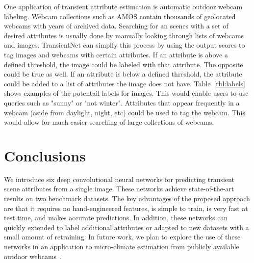\documentclass{article}
\newcommand{\tblref}[1]{Table~\ref{tbl:#1}}
\begin{document}
One application of transient attribute estimation is automatic outdoor
webcam labeling. Webcam collections such as AMOS\cite{jacobs07amos} contain
thousands of geolocated webcams with years of archived data.  Searching
for an scenes with a set of desired attributes is usually done by manually
looking through lists of webcams and images.  TransientNet can simplfy this
process by using the output scores to tag images and webcams with certain 
attributes.  If an attribute is above a defined threshold, the image could 
be labeled with that attribute.  The opposite could be true as well.  If an
attribute is below a defined threshold, the attribute could be added to a 
list of attributes the image does not have.  \tblref{labels} shows examples of
the potentail labels for images. This would enable users to use queries such 
as "sunny" or "not winter".  Attributes that appear frequently in a webcam 
(aside from daylight, night, etc) could be used to tag the webcam.  This would 
allow for much easier searching of large collections of webcams.


\section{Conclusions}

We introduce six deep convolutional neural networks for predicting
transient scene attributes from a single image. These networks achieve
state-of-the-art results on two benchmark datasets. The key advantages
of the proposed approach are that it requires no hand-engineered
features, is simple to train, is very fast at test time, and makes
accurate predictions. In addition, these networks can quickly extended
to label additional attributes or adapted to new datasets with a small
amount of retraining. In future work, we plan to explore the use of
these networks in an application to micro-climate estimation from
publicly available outdoor webcams~\cite{islam13webcamweather}. 



\end{document}
